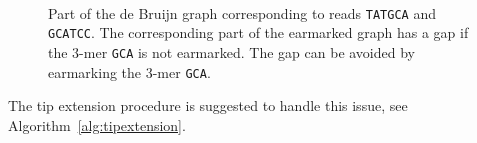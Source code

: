 \documentclass[12pt]{article}
\begin{document}
\begin{figure}
\begin{center}
\\
\end{center}
\caption{ Part of the de Bruijn graph corresponding to reads 
{\tt TATGCA} and {\tt GCATCC}.  The corresponding part 
of the earmarked graph has a gap if the $3$-mer {\tt GCA} is not 
earmarked.  The gap can be avoided by earmarking the $3$-mer 
{\tt GCA}.}\label{fig:tipexample}
\end{figure}


The tip extension procedure is suggested to handle this issue,
see Algorithm~\ref{alg:tipextension}.{}
\end{document}
